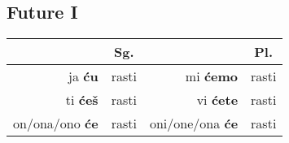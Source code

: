 \documentclass[a4paper]{article}
\begin{document}
\subsection*{Future I}
\begin{tabular}{r@{ }lr@{ }l}
  & \multicolumn{1}{c}{Sg.} & & \multicolumn{1}{c}{Pl.} \\
  \midrule
  ja \textbf{ću} & rasti & mi \textbf{ćemo} & rasti \\
  ti \textbf{ćeš} & rasti & vi \textbf{ćete} & rasti \\
  on/ona/ono \textbf{će} & rasti & oni/one/ona \textbf{će} & rasti \\
  \bottomrule
\end{tabular}
\end{document}
